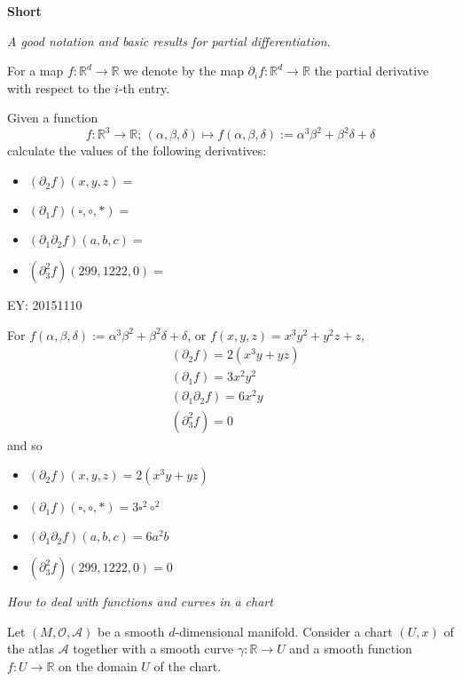 \textbf{Short} 

\emph{A good notation and basic results for partial differentiation}.

For a map $f: \mathbb{R}^d \to \mathbb{R}$ we denote by the map $\partial_i f: \mathbb{R}^d \to \mathbb{R}$ the partial derivative with respect to the $i$-th entry.

\questionhead{:} Given a function
\[
f: \mathbb{R}^3 \to \mathbb{R}; \, (\alpha, \beta, \delta) \mapsto f(\alpha,\beta,\delta) := \alpha^3\beta^2 + \beta^2 \delta + \delta
\]
calculate the values of the following derivatives:

\solutionhead{:}

\begin{itemize}
  \item $(\partial_2f)(x,y,z) = $
  \item $(\partial_1f)(\square,\circ,*) =$
  \item $(\partial_1 \partial_2 f)(a,b,c) = $ 
  \item $(\partial_3^2 f)(299,1222,0) =$
\end{itemize}

EY: 20151110

For $f(\alpha,\beta,\delta) := \alpha^3\beta^2 + \beta^2 \delta + \delta$, or $f(x,y,z) = x^3 y^2 + y^2 z + z$, 
\[
\begin{aligned}
  & (\partial_2 f) = 2(x^3y+yz) \\ 
  & (\partial_1 f) = 3x^2 y^2 \\ 
  & (\partial_1\partial_2 f) = 6x^2 y \\ 
  & (\partial_3^2f) = 0 
\end{aligned}
\]
and so 
\begin{itemize}
  \item $(\partial_2f)(x,y,z) = 2(x^3 y + yz)  $
  \item $(\partial_1f)(\square,\circ,*) = 3\square^2 \circ^2$
  \item $(\partial_1 \partial_2 f)(a,b,c) = 6a^2 b$ 
  \item $(\partial_3^2 f)(299,1222,0) = 0$
\end{itemize}




\emph{How to deal with functions and curves in a chart} 

Let $(M, \mathcal{O}, \mathcal{A})$ be a smooth $d$-dimensional manifold.  Consider a chart $(U,x)$ of the atlas $\mathcal{A}$ together with a smooth curve $\gamma : \mathbb{R} \to U$ and a smooth function $f:U \to \mathbb{R}$ on the domain $U$ of the chart. 

